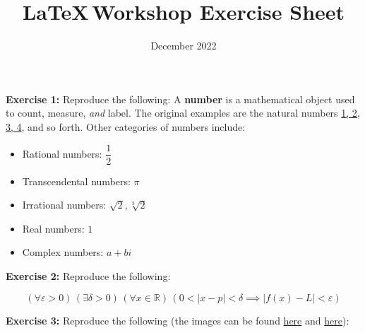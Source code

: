\documentclass[10pt]{article}
\title{\LaTeX\,Workshop Exercise Sheet}
\date{December 2022}
\newcommand{\R}{\mathbb{R}}
\begin{document}
    \maketitle


    
    \noindent\textbf{Exercise 1:} Reproduce the following:
        A \textbf{number} is a mathematical object used to count, measure, \textit{and} label. The original examples are the natural numbers \underline{1, 2, 3, 4}, and so forth. Other categories of numbers include:
    \begin{itemize}
        \item Rational numbers: $\dfrac{1}{2}$
        \item Transcendental numbers: $\pi$
        \item Irrational numbers: $\sqrt{2}, \sqrt[3]{2}$ 
        \item Real numbers: $1$
        \item Complex numbers: $a+bi$
    \end{itemize}


    \vspace{1em}
    
    \noindent\textbf{Exercise 2:} Reproduce the following:

    $$(\forall \varepsilon > 0 ) \, (\exists \delta > 0) \, (\forall x \in \R) \, (0 < |x - p| < \delta \implies |f(x) - L| < \varepsilon)$$
    
    \vspace{1em}
    
    \noindent\textbf{Exercise 3:} Reproduce the following (the images can be found \href{https://www.amazon.com/Mathematics-Student-Teacher-Pullover-Hoodie/dp/B09784RL5C}{here} and \href{https://i.redd.it/1zfte27tn3q21.jpg}{here}):
\end{document}
